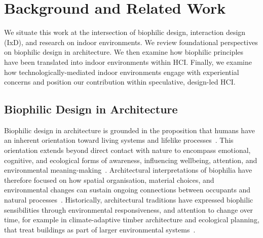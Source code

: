\section{Background and Related Work}
\label{sec:ch5-background-related}
We situate this work at the intersection of biophilic design, interaction design (IxD), and research on indoor environments. We review foundational perspectives on biophilic design in architecture. We then examine how biophilic principles have been translated into indoor environments within HCI. Finally, we examine how technologically-mediated indoor environments engage with experiential concerns and position our contribution within speculative, design-led HCI.

\subsection{Biophilic Design in Architecture}

Biophilic design in architecture is grounded in the proposition that humans have an inherent orientation toward living systems and lifelike processes~\cite{wilson1986biophilia}. This orientation extends beyond direct contact with nature to encompass emotional, cognitive, and ecological forms of awareness, influencing wellbeing, attention, and environmental meaning-making~\cite{ulrich1984view, beatley2009biophilic}. Architectural interpretations of biophilia have therefore focused on how spatial organisation, material choices, and environmental changes can sustain ongoing connections between occupants and natural processes~\cite{gil2015biophilic, aristizabal2021biophilic}. Historically, architectural traditions have expressed biophilic sensibilities through environmental responsiveness, and attention to change over time, for example in climate-adaptive timber architecture and ecological planning, that treat buildings as part of larger environmental systems~\cite{beatley2016chapter, kim2009alvar, mcharg1969design}.

